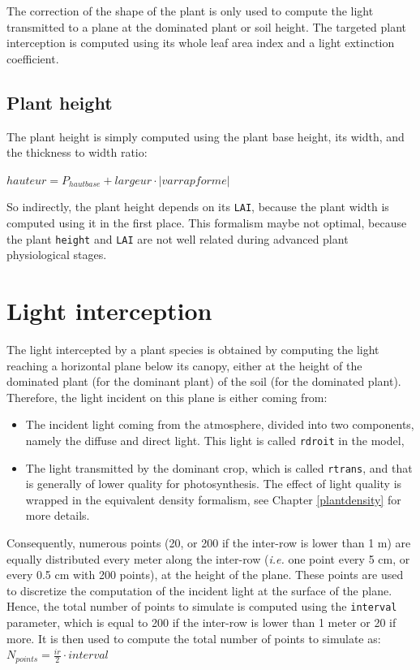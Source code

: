 \documentclass[]{book}
\providecommand{\tightlist}{%
  \setlength{\itemsep}{0pt}\setlength{\parskip}{0pt}}
\begin{document}
The correction of the shape of the plant is only used to compute the light transmitted to a plane at the dominated plant or soil height. The targeted plant interception is computed using its whole leaf area index and a light extinction coefficient.

\hypertarget{plant-height}{%
\subsection{Plant height}\label{plant-height}}

The plant height is simply computed using the plant base height, its width, and the thickness to width ratio:

\(hauteur=P_{hautbase}+largeur\cdot\left|varrapforme\right|\)

So indirectly, the plant height depends on its \texttt{LAI}, because the plant width is computed using it in the first place.
This formalism maybe not optimal, because the plant \texttt{height} and \texttt{LAI} are not well related during advanced plant physiological stages.

\hypertarget{light-interception}{%
\section{Light interception}\label{light-interception}}

The light intercepted by a plant species is obtained by computing the light reaching a horizontal plane below its canopy, either at the height of the dominated plant (for the dominant plant) of the soil (for the dominated plant). Therefore, the light incident on this plane is either coming from:

\begin{itemize}
\tightlist
\item
  The incident light coming from the atmosphere, divided into two components, namely the diffuse and direct light. This light is called \texttt{rdroit} in the model,
\item
  The light transmitted by the dominant crop, which is called \texttt{rtrans}, and that is generally of lower quality for photosynthesis. The effect of light quality is wrapped in the equivalent density formalism, see Chapter \ref{plantdensity} for more details.
\end{itemize}

Consequently, numerous points (20, or 200 if the inter-row is lower than 1 m) are equally distributed every meter along the inter-row (\emph{i.e.} one point every 5 cm, or every 0.5 cm with 200 points), at the height of the plane. These points are used to discretize the computation of the incident light at the surface of the plane.\\
Hence, the total number of points to simulate is computed using the \texttt{interval} parameter, which is equal to 200 if the inter-row is lower than 1 meter or 20 if more. It is then used to compute the total number of points to simulate as: \(N_{points}=\frac{ir}{2}\cdot interval\)
\end{document}
